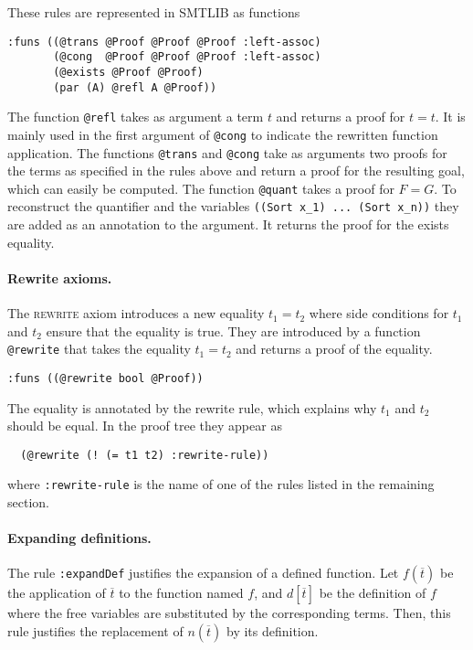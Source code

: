 \documentclass[a4paper]{article}
\begin{document}
These rules are represented in SMTLIB as functions
\begin{verbatim}
:funs ((@trans @Proof @Proof @Proof :left-assoc)
       (@cong  @Proof @Proof @Proof :left-assoc)
       (@exists @Proof @Proof)
       (par (A) @refl A @Proof))
\end{verbatim}

The function \verb+@refl+ takes as argument a term $t$ and returns a
proof for $t=t$.  It is mainly used in the first argument of
\verb+@cong+ to indicate the rewritten function application.  The
functions \verb+@trans+ and \verb+@cong+ take as arguments two proofs
for the terms as specified in the rules above and return a proof for
the resulting goal, which can easily be computed.  The function
\verb+@quant+ takes a proof for $F=G$.  To reconstruct the quantifier
and the variables \verb+((Sort x_1) ... (Sort x_n))+ they are added as
an annotation to the argument.  It returns the proof for the exists
equality.

\paragraph{Rewrite axioms.}  The \textsc{rewrite} axiom introduces a
new equality $t_1=t_2$ where side conditions for $t_1$ and $t_2$
ensure that the equality is true.  They are introduced by a function
\verb+@rewrite+ that takes the equality $t_1=t_2$ and
returns a proof of the equality.

\begin{verbatim}
:funs ((@rewrite bool @Proof))
\end{verbatim}

The equality is annotated by the rewrite rule, which explains why
$t_1$ and $t_2$ should be equal. In the proof tree they appear as

\begin{verbatim}
  (@rewrite (! (= t1 t2) :rewrite-rule))
\end{verbatim}

where \texttt{:rewrite-rule} is the name of one of the rules listed in
the remaining section.


\paragraph{Expanding definitions.}  The rule \texttt{:expandDef} justifies
the expansion of a defined function.  Let $f(\overline{t})$ be the
application of $\overline{t}$ to the function named $f$, and
$d[\overline{t}]$ be the definition of $f$ where the free variables are
substituted by the corresponding terms.  Then, this rule justifies the
replacement of $n(\overline{t})$ by its definition.
\end{document}
